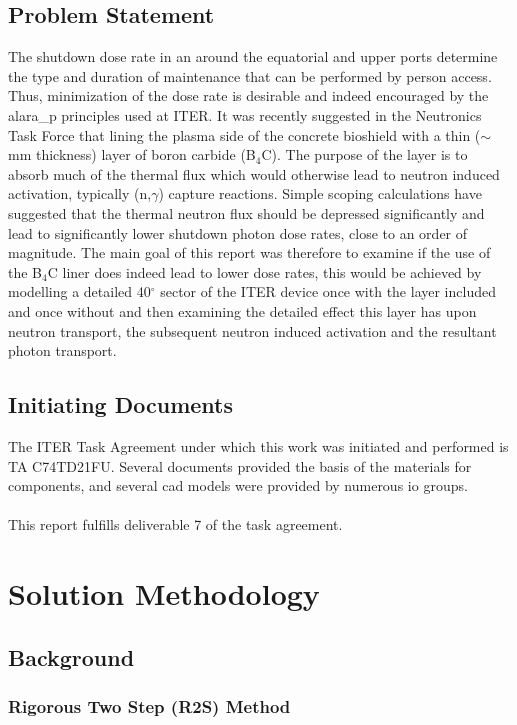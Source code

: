\documentclass[12pt]{article}
\begin{document}
\subsection{Problem Statement}
The shutdown dose rate in an around the equatorial and upper ports determine the
type and duration of maintenance that can be performed by person access. Thus,
minimization of the dose rate is desirable and indeed encouraged by the \gls{alara_p}
principles used at ITER. It was recently suggested in the Neutronics Task Force
that lining the plasma side of the concrete bioshield with a thin ($\sim$ mm
thickness) layer of boron carbide (B$_4$C). The purpose of the layer is to
absorb much of the thermal flux which would otherwise lead to neutron induced
activation, typically (n,$\gamma$) capture reactions. Simple scoping
calculations have suggested that the thermal neutron flux should be depressed
significantly and lead to significantly lower shutdown photon dose rates, close
to an order of magnitude. The main goal of this report was therefore to examine
if the use of the B$_4$C liner does indeed lead to lower dose rates, this would
be achieved by modelling a detailed 40$^{\circ}$ sector of the ITER device once
with the layer included and once without and then examining the detailed effect
this layer has upon neutron transport, the subsequent neutron induced activation
and the resultant photon transport.
\subsection{Initiating Documents}
The ITER Task Agreement under which this work was initiated and performed is TA
C74TD21FU. Several documents provided the basis of the materials for components,
and several \gls{cad} models were provided by numerous \gls{io} groups.
\\
\\
This report fulfills deliverable 7 of the task agreement.
\newpage
\section{Solution Methodology}
\subsection{Background}

\subsubsection{Rigorous Two Step (R2S) Method}
\end{document}
